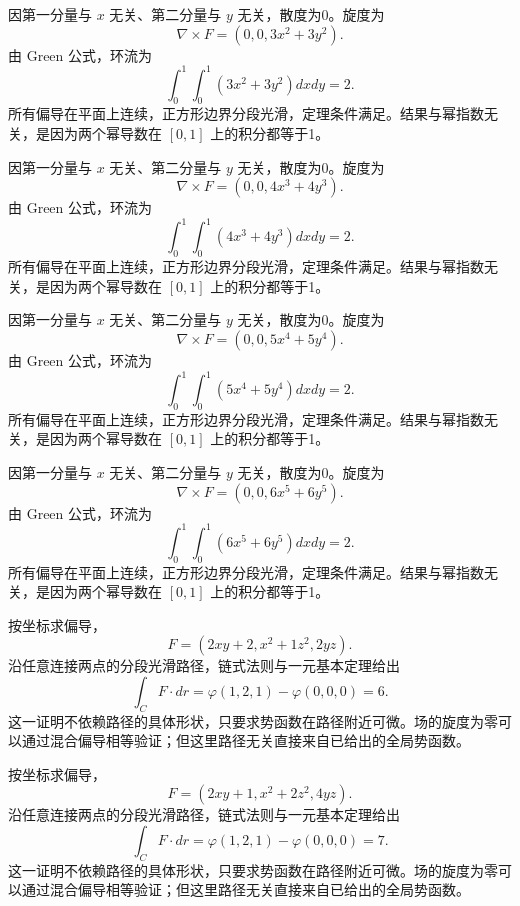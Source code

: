 \documentclass[12pt,fontset=fandol]{ctexart}
\begin{document}
\begin{solve}\label{ans:c44q9}
因第一分量与 $x$ 无关、第二分量与 $y$ 无关，散度为0。旋度为
\[
\nabla\times F=(0,0,3x^{2}+3y^{2}).
\]
由 Green 公式，环流为
\[
\int_0^1\int_0^1(3x^{2}+3y^{2})dxdy=2.
\]
所有偏导在平面上连续，正方形边界分段光滑，定理条件满足。结果与幂指数无关，是因为两个幂导数在 $[0,1]$ 上的积分都等于1。
\end{solve}

\begin{solve}\label{ans:c44q10}
因第一分量与 $x$ 无关、第二分量与 $y$ 无关，散度为0。旋度为
\[
\nabla\times F=(0,0,4x^{3}+4y^{3}).
\]
由 Green 公式，环流为
\[
\int_0^1\int_0^1(4x^{3}+4y^{3})dxdy=2.
\]
所有偏导在平面上连续，正方形边界分段光滑，定理条件满足。结果与幂指数无关，是因为两个幂导数在 $[0,1]$ 上的积分都等于1。
\end{solve}

\begin{solve}\label{ans:c44q11}
因第一分量与 $x$ 无关、第二分量与 $y$ 无关，散度为0。旋度为
\[
\nabla\times F=(0,0,5x^{4}+5y^{4}).
\]
由 Green 公式，环流为
\[
\int_0^1\int_0^1(5x^{4}+5y^{4})dxdy=2.
\]
所有偏导在平面上连续，正方形边界分段光滑，定理条件满足。结果与幂指数无关，是因为两个幂导数在 $[0,1]$ 上的积分都等于1。
\end{solve}

\begin{solve}\label{ans:c44q12}
因第一分量与 $x$ 无关、第二分量与 $y$ 无关，散度为0。旋度为
\[
\nabla\times F=(0,0,6x^{5}+6y^{5}).
\]
由 Green 公式，环流为
\[
\int_0^1\int_0^1(6x^{5}+6y^{5})dxdy=2.
\]
所有偏导在平面上连续，正方形边界分段光滑，定理条件满足。结果与幂指数无关，是因为两个幂导数在 $[0,1]$ 上的积分都等于1。
\end{solve}

\begin{solve}\label{ans:c44q13}
按坐标求偏导，
\[
F=(2xy+2,x^2+1z^2,2yz).
\]
沿任意连接两点的分段光滑路径，链式法则与一元基本定理给出
\[
\int_CF\cdot dr=\varphi(1,2,1)-\varphi(0,0,0)=6.
\]
这一证明不依赖路径的具体形状，只要求势函数在路径附近可微。场的旋度为零可以通过混合偏导相等验证；但这里路径无关直接来自已给出的全局势函数。
\end{solve}

\begin{solve}\label{ans:c44q14}
按坐标求偏导，
\[
F=(2xy+1,x^2+2z^2,4yz).
\]
沿任意连接两点的分段光滑路径，链式法则与一元基本定理给出
\[
\int_CF\cdot dr=\varphi(1,2,1)-\varphi(0,0,0)=7.
\]
这一证明不依赖路径的具体形状，只要求势函数在路径附近可微。场的旋度为零可以通过混合偏导相等验证；但这里路径无关直接来自已给出的全局势函数。
\end{solve}
\end{document}
